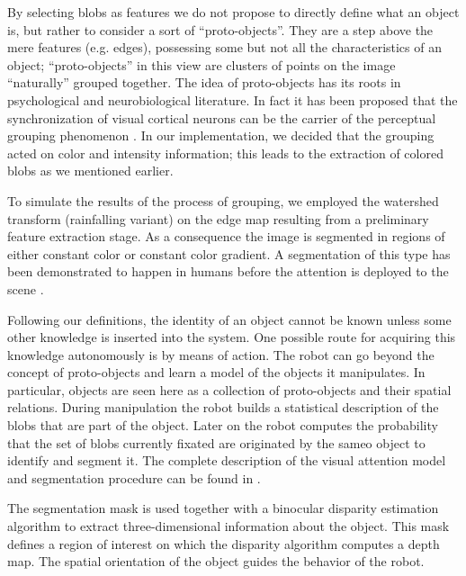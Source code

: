 By selecting blobs as features we do not propose to directly define what an object is, but rather to consider a sort of ``proto-objects''. They are a step above the mere features (e.g. edges), possessing some but not all the characteristics of an object; ``proto-objects'' in this view are clusters of points on the image ``naturally'' grouped together. The idea of proto-objects has its roots in psychological \cite{pylyshyn01indexes} and neurobiological literature. In fact it has been proposed that the synchronization of visual cortical neurons can be the carrier of the perceptual grouping phenomenon \cite{eckhorn88coherent,gray89oscillatory}.
In our implementation, we decided that the grouping acted on color and intensity information; this leads to the extraction of colored blobs as we mentioned earlier. 

To simulate the results of the process of grouping, we employed the watershed transform (rainfalling variant) \cite{smet00rainfalling} on the edge map resulting from a preliminary feature extraction stage. As a consequence the image is segmented in regions of either constant color or constant color gradient. A segmentation of this type has been demonstrated to happen in humans before the attention is deployed to the scene \cite{driver00segmentation}.

Following our definitions, the identity of an object cannot be known unless some other knowledge is inserted into the system. One possible route for acquiring this knowledge autonomously is by means of action. The robot can go beyond the concept of proto-objects and learn a model of the objects it manipulates. In particular, objects are seen here as a collection of proto-objects and their spatial relations. During manipulation the robot builds a statistical description of the blobs that are part of the object. Later on the robot computes the probability that the set of blobs currently fixated are originated by the sameo object to identify and segment it. The complete description of the visual attention model and segmentation procedure can be found in \cite{orabona05object}.

The segmentation mask is used together with a binocular disparity estimation algorithm to extract three-dimensional information about the object.
This mask defines a region of interest on which the disparity algorithm computes a depth map. The spatial orientation of the object guides the behavior of the robot.

